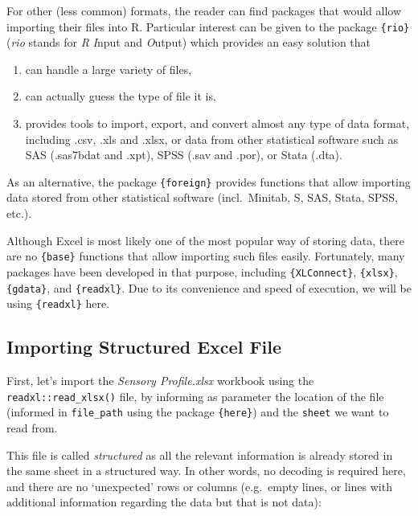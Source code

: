 \documentclass[
]{book}
\providecommand{\tightlist}{%
  \setlength{\itemsep}{0pt}\setlength{\parskip}{0pt}}
\begin{document}
For other (less common) formats, the reader can find packages that would allow importing their files into R. Particular interest can be given to the package \texttt{\{rio\}} (\emph{rio} stands for \emph{R} \emph{I}nput and \emph{O}utput) which provides an easy solution that

\begin{enumerate}
\def\labelenumi{\arabic{enumi}.}
\tightlist
\item
  can handle a large variety of files,
\item
  can actually guess the type of file it is,
\item
  provides tools to import, export, and convert almost any type of data format, including .csv, .xls and .xlsx, or data from other statistical software such as SAS (.sas7bdat and .xpt), SPSS (.sav and .por), or Stata (.dta).
\end{enumerate}

As an alternative, the package \texttt{\{foreign\}} provides functions that allow importing data stored from other statistical software (incl.~Minitab, S, SAS, Stata, SPSS, etc.).

Although Excel is most likely one of the most popular way of storing data, there are no \texttt{\{base\}} functions that allow importing such files easily. Fortunately, many packages have been developed in that purpose, including \texttt{\{XLConnect\}}, \texttt{\{xlsx\}}, \texttt{\{gdata\}}, and \texttt{\{readxl\}}. Due to its convenience and speed of execution, we will be using \texttt{\{readxl\}} here.

\hypertarget{importing-structured-excel-file}{%
\subsection{Importing Structured Excel File}\label{importing-structured-excel-file}}

First, let's import the \emph{Sensory Profile.xlsx} workbook using the \texttt{readxl::read\_xlsx()} file, by informing as parameter the location of the file (informed in \texttt{file\_path} using the package \texttt{\{here\}}) and the \texttt{sheet} we want to read from.

This file is called \emph{structured} as all the relevant information is already stored in the same sheet in a structured way. In other words, no decoding is required here, and there are no `unexpected' rows or columns (e.g.~empty lines, or lines with additional information regarding the data but that is not data):
\end{document}
